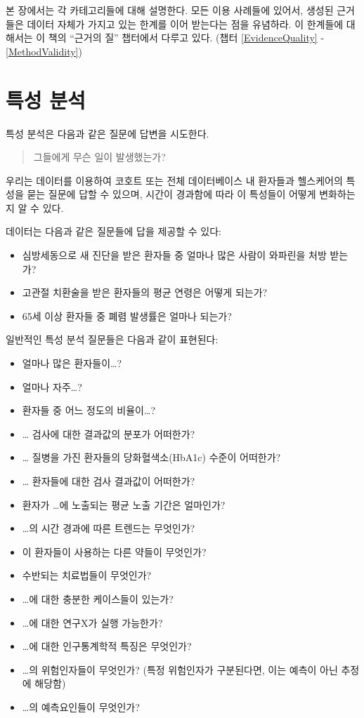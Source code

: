 \documentclass[11pt]{book}
\providecommand{\tightlist}{%
  \setlength{\itemsep}{0pt}\setlength{\parskip}{0pt}}
\theoremstyle{definition}
\theoremstyle{definition}
\theoremstyle{definition}
\theoremstyle{remark}
\begin{document}
본 장에서는 각 카테고리들에 대해 설명한다. 모든 이용 사례들에 있어서,
생성된 근거들은 데이터 자체가 가지고 있는 한계를 이어 받는다는 점을
유념하라. 이 한계들에 대해서는 이 책의 ``근거의 질'' 챕터에서 다루고
있다. (챕터 \ref{EvidenceQuality} - \ref{MethodValidity})

\section{특성 분석}\label{-}


특성 분석은 다음과 같은 질문에 답변을 시도한다.

\begin{quote}
그들에게 무슨 일이 발생했는가?
\end{quote}

우리는 데이터를 이용하여 코호트 또는 전체 데이터베이스 내 환자들과
헬스케어의 특성을 묻는 질문에 답할 수 있으며, 시간이 경과함에 따라 이
특성들이 어떻게 변화하는지 알 수 있다.

데이터는 다음과 같은 질문들에 답을 제공할 수 있다:

\begin{itemize}
\tightlist
\item
  심방세동으로 새 진단을 받은 환자들 중 얼마나 많은 사람이 와파린을 처방
  받는가?
\item
  고관절 치환술을 받은 환자들의 평균 연령은 어떻게 되는가?
\item
  65세 이상 환자들 중 폐렴 발생률은 얼마나 되는가?
\end{itemize}

일반적인 특성 분석 질문들은 다음과 같이 표현된다:

\begin{itemize}
\tightlist
\item
  얼마나 많은 환자들이\ldots{}?
\item
  얼마나 자주\ldots{}?
\item
  환자들 중 어느 정도의 비율이\ldots{}?
\item
  \ldots{} 검사에 대한 결과값의 분포가 어떠한가?
\item
  \ldots{} 질병을 가진 환자들의 당화혈색소(HbA1c) 수준이 어떠한가?
\item
  \ldots{} 환자들에 대한 검사 결과값이 어떠한가?
\item
  환자가 \ldots{}에 노출되는 평균 노출 기간은 얼마인가?
\item
  \ldots{}의 시간 경과에 따른 트렌드는 무엇인가?
\item
  이 환자들이 사용하는 다른 약들이 무엇인가?
\item
  수반되는 치료법들이 무엇인가?
\item
  \ldots{}에 대한 충분한 케이스들이 있는가?
\item
  \ldots{}에 대한 연구X가 실행 가능한가?
\item
  \ldots{}에 대한 인구통계학적 특징은 무엇인가?
\item
  \ldots{}의 위험인자들이 무엇인가? (특정 위험인자가 구분된다면, 이는
  예측이 아닌 추정에 해당함)
\item
  \ldots{}의 예측요인들이 무엇인가?
\end{itemize}
\end{document}
